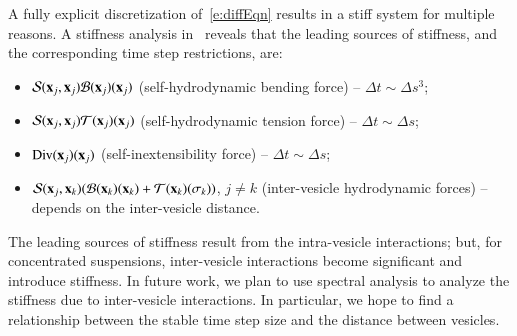 A fully explicit discretization of~\eqref{e:diffEqn} results in a stiff
system for multiple reasons.  A stiffness analysis
in~\cite{vee:gue:zor:bir2009} reveals that the leading sources of
stiffness, and the corresponding time step restrictions, are:
\begin{itemize}
  \item ${\mathcal{S}}({\mathbf{x}}_{j},{\mathbf{x}}_{j}){\mathcal{B}}({\mathbf{x}}_{j})({\mathbf{x}}_{j})$ (self-hydrodynamic
  bending force) -- $\Delta t \sim \Delta s^{3}$;

  \item ${\mathcal{S}}({\mathbf{x}}_{j},{\mathbf{x}}_{j}){\mathcal{T}}({\mathbf{x}}_{j})({\mathbf{x}}_{j})$ (self-hydrodynamic
  tension force) -- $\Delta t \sim \Delta s$;

  \item $\mathrm{Div}({\mathbf{x}}_{j})({\mathbf{x}}_{j})$ (self-inextensibility force) -- $\Delta
  t \sim \Delta s$;

  \item ${\mathcal{S}}({\mathbf{x}}_{j},{\mathbf{x}}_{k})({\mathcal{B}}({\mathbf{x}}_{k})({\mathbf{x}}_{k}) +
  {\mathcal{T}}({\mathbf{x}}_{k})(\sigma_{k}))$, $j \neq k$ (inter-vesicle hydrodynamic
  forces) -- depends on the inter-vesicle distance.
\end{itemize}
The leading sources of stiffness result from the intra-vesicle
interactions; but, for concentrated suspensions, inter-vesicle
interactions become significant and introduce stiffness.  In future
work, we plan to use spectral analysis to analyze the stiffness due to
inter-vesicle interactions.  In particular, we hope to find a
relationship between the stable time step size and the distance between
vesicles.

